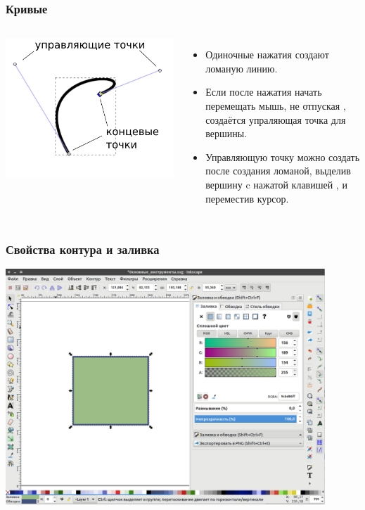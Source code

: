 \documentclass[12pt, compress]{beamer}
\begin{document}
\begin{frame}
\frametitle{Кривые }
\begin{columns}
\centering
\includegraphics[width=1\textwidth]{безье.png}
\begin{itemize}
  \item Одиночные нажатия  создают ломаную линию.
  \item Если после нажатия  начать перемещать мышь, не отпуская , создаётся упраляющая точка для вершины.
  \item Управляющую точку можно создать после создания ломаной, выделив вершину  c нажатой клавишей , и переместив курсор.
\end{itemize}
\end{columns}
\end{frame}

\begin{frame}
\frametitle{Свойства контура и заливка }
\centering
\includegraphics[width=0.9\textwidth]{заливка.png}
\end{frame}
\end{document}
